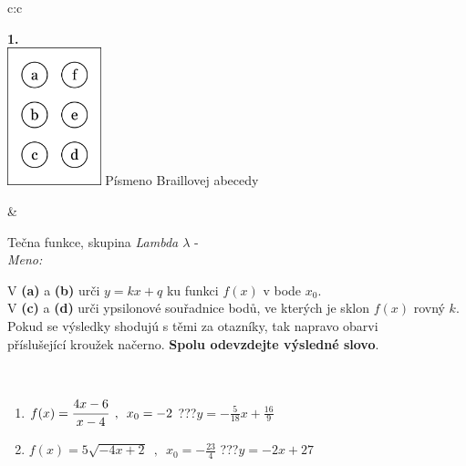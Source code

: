\documentclass[10pt]{report}
\begin{document}
\begin{tabular}{c:c}
\begin{minipage}[c][104.5mm][t]{0.5\linewidth}
\begin{center}
\begin{minipage}{0.20\linewidth}
\begin{center}
{\Huge\bfseries 1.} \\[2mm]
\includegraphics[height=40mm]{../images/braille.png}
{\small Písmeno Braillovej abecedy}
\end{center}
\end{minipage}
\end{center}
\end{minipage}
&
\begin{minipage}[c][104.5mm][t]{0.5\linewidth}
\begin{center}
\vspace{7mm}
{\huge Tečna funkce, skupina \textit{Lambda $\lambda$} -}\\[5mm]
\textit{Meno:}\phantom{xxxxxxxxxxxxxxxxxxxxxxxxxxxxxxxxxxxxxxxxxxxxxxxxxxxxxxxxxxxxxxxxx}\\[5mm]
\begin{minipage}{0.95\linewidth}
\begin{center}
V \textbf{(a)} a \textbf{(b)} urči  $y = kx + q$ ku funkci $f(x)$ v bode $x_0$.\\V \textbf{(c)} a \textbf{(d)} urči ypsilonové souřadnice bodů, ve kterých je sklon $f(x)$ rovný $k$.\\Pokud se výsledky shodujú s těmi za otazníky, tak napravo obarvi\\příslušející kroužek načerno. \textbf{Spolu odevzdejte výsledné slovo}.
\end{center}
\end{minipage}
\\[1mm]
\begin{minipage}{0.79\linewidth}
\begin{center}
\begin{varwidth}{\linewidth}
\begin{enumerate}
\small
\item $f(x)=\cfrac{4x-6}{x-4}\enspace , \enspace x_0=-2$\quad \dotfill\; ???\;\dotfill \quad $y = -\frac{5}{18}x+\frac{16}{9}$
\item $f(x)=5\sqrt{-4x+2}\enspace , \enspace x_0=-\frac{23}{4}$\quad \dotfill\; ???\;\dotfill \quad $y = -2x+27$

\end{enumerate}
\end{varwidth}
\end{center}
\end{minipage}
\end{center}
\end{minipage}
\end{tabular}
\end{document}
